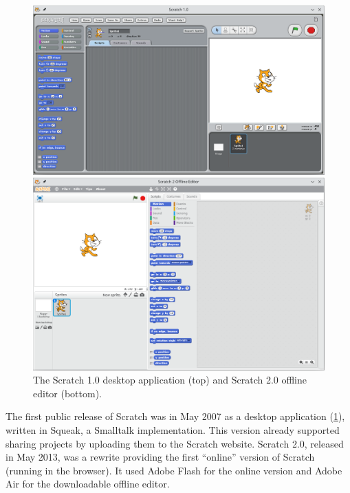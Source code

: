 \documentclass[../main]{subfiles}
\begin{document}
\begin{figure}
    \begin{wide}
        \includegraphics[width=\linewidth]{scratch-1}

        \vspace{1em}
        \includegraphics[width=\linewidth]{scratch-2}
    \end{wide}
    \caption{The Scratch 1.0 desktop application (top) and Scratch 2.0 offline editor (bottom).}
    \label{fig:scratch-1.0}
\end{figure}


The first public release of Scratch was in May 2007 as a desktop application (\cref{fig:scratch-1.0}), written in Squeak, a Smalltalk implementation.
This version already supported sharing projects by uploading them to the Scratch website.
Scratch 2.0, released in May 2013, was a rewrite providing the first ``online'' version of Scratch (running in the browser).
It used Adobe Flash for the online version and Adobe Air for the downloadable offline editor.
\end{document}
